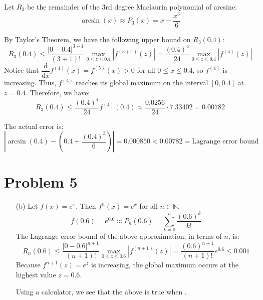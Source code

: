 \documentclass[preview, margin=0.6in]{standalone}
\newcommand*{\problem}[1]{\section*{Problem #1}}
\newcommand*{\deriv}[1][x]{\ensuremath{\dfrac{\mathrm{d}}{\mathrm{d}#1}}}
\begin{document}
\begin{itemize}
		Let $R_3$ be the remainder of the 3rd degree Maclaurin polynomial of arcsine:
		\begin{equation*}
		    \arcsin(x)
			\approx P_3(x)
			=x-\frac{x^3}{6}
		\end{equation*}

		By Taylor's Theorem, we have the following upper bound on $R_3(0.4)$:
		\begin{equation*}
		    R_3(0.4)
			\leq \frac{\left|0-0.4\right|^{3+1}}{(3+1)!} \max_{0\leq z\leq 0.4} \left|f^{(3+1)}(z)\right|
			=\frac{(0.4)^4}{24} \max_{0\leq z\leq 0.4} \left|f^{(4)}(z)\right|
		\end{equation*}
		Notice that $\deriv f^{(4)}(x)=f^{(5)}(x)>0$ for all $0\leq x\leq0.4$, so $f^{(4)}$ is increasing. Thus, $f^{(4)}$ reaches its global maximum on the interval $[0,0.4]$ at $z=0.4$. Therefore, we have:
		\begin{equation*}
		    R_3(0.4)
			\leq\frac{(0.4)^4}{24} f^{(4)}(0.4)
			\approx\frac{0.0256}{24}\cdot7.33402
			=\boxed{0.00782}
		\end{equation*}

		The actual error is:
		\begin{equation*}
			\left|\arcsin\left(0.4\right)-\left(0.4+\frac{(0.4)^3}{6}\right)\right|=0.000850 < 0.00782 = \text{Lagrange error bound}
		\end{equation*}
\end{itemize}

\problem{5}
\begin{itemize}
\item[(b)]
	Let $f(x)=e^x$. Then $f^{n}(x)=e^x$ for all $n\in\mathbb N$.
	\begin{equation*}
		f(0.6)
		=e^{0.6}
		\approx P_n(0.6)
		=\sum_{k=0}^{n}\frac{(0.6)^k}{k!}
	\end{equation*}
	The Lagrange error bound of the above approximation, in terms of $n$, is:
	\begin{equation*}
		R_n(0.6)
		\leq \frac{\left|0-0.6\right|^{n+1}}{(n+1)!}\max_{0\leq z\leq 0.6}\left|f^{(n+1)}(z)\right|
		=\frac{(0.6)^{n+1}}{(n+1)!}e^{0.6}\leq 0.001
	\end{equation*}
	Because $f^{n+1}(z)=e^z$ is increasing, the global maximum occurs at the highest value $z=0.6$.

	Using a calculator, we see that the above is true when .
\end{itemize}
\end{document}
